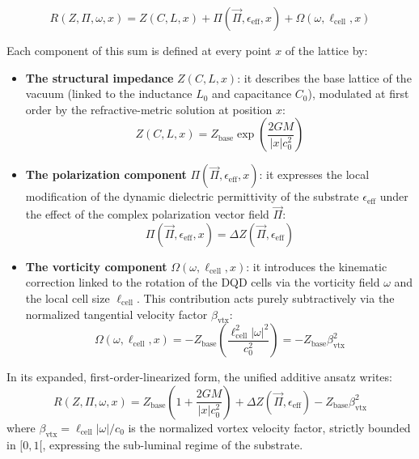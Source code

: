\documentclass[11pt,a4paper]{article}
\theoremstyle{plain}
\theoremstyle{remark}
\begin{document}
\begin{equation}
\label{eq:additive_ansatz_global}
\boxed{R(Z, \Pi, \omega, x) = Z(C, L, x) + \Pi(\vec{\Pi}, \epsilon_{\text{eff}}, x) + \Omega(\omega, \ell_{\text{cell}}, x)}
\end{equation}

Each component of this sum is defined at every point $x$ of the lattice by:
\begin{itemize}
    \item \textbf{The structural impedance} $Z(C, L, x)$: it describes the base lattice of the vacuum (linked to the inductance $L_0$ and capacitance $C_0$), modulated at first order by the refractive-metric solution at position $x$:
    \begin{equation}
    Z(C, L, x) = Z_{\text{base}} \exp\left(\frac{2GM}{|x|c_{0}^{2}}\right)
    \end{equation}
    \item \textbf{The polarization component} $\Pi(\vec{\Pi}, \epsilon_{\text{eff}}, x)$: it expresses the local modification of the dynamic dielectric permittivity of the substrate $\epsilon_{\text{eff}}$ under the effect of the complex polarization vector field $\vec{\Pi}$:
    \begin{equation}
    \Pi(\vec{\Pi}, \epsilon_{\text{eff}}, x) = \Delta Z(\vec{\Pi}, \epsilon_{\text{eff}})
    \end{equation}
    \item \textbf{The vorticity component} $\Omega(\omega, \ell_{\text{cell}}, x)$: it introduces the kinematic correction linked to the rotation of the DQD cells via the vorticity field $\omega$ and the local cell size $\ell_{\text{cell}}$. This contribution acts purely subtractively via the normalized tangential velocity factor $\beta_{\text{vtx}}$:
    \begin{equation}
    \Omega(\omega, \ell_{\text{cell}}, x) = - Z_{\text{base}} \left(\frac{\ell_{\text{cell}}^{2}|\omega|^{2}}{c_{0}^{2}}\right) = - Z_{\text{base}} \beta_{\text{vtx}}^{2}
    \end{equation}
\end{itemize}

In its expanded, first-order-linearized form, the unified additive ansatz writes:
\begin{equation}
\label{eq:additive_ansatz_expanded}
R(Z, \Pi, \omega, x) = Z_{\text{base}}\left(1 + \frac{2GM}{|x|c_{0}^{2}}\right) + \Delta Z(\vec{\Pi}, \epsilon_{\text{eff}}) - Z_{\text{base}}\beta_{\text{vtx}}^{2}
\end{equation}
where $\beta_{\text{vtx}} = \ell_{\text{cell}}|\omega|/c_{0}$ is the normalized vortex velocity factor, strictly bounded in $[0,1[$, expressing the sub-luminal regime of the substrate.
\end{document}
